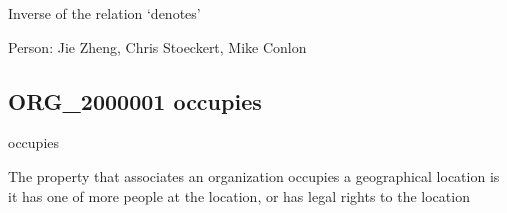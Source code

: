 \documentclass[letterpaper,10pt,english]{sphinxmanual}
\begin{document}
\begin{sphinxShadowBox}

\sphinxAtStartPar
{\hyperref[\detokenize{doc-IAO_0000136::doc}]{}}
\end{sphinxShadowBox}

\begin{sphinxShadowBox}

\sphinxAtStartPar
Inverse of the relation ‘denotes’
\end{sphinxShadowBox}

\begin{sphinxShadowBox}

\sphinxAtStartPar
{}
\end{sphinxShadowBox}

\begin{sphinxShadowBox}

\sphinxAtStartPar
Person: Jie Zheng, Chris Stoeckert, Mike Conlon
\end{sphinxShadowBox}
\begin{quote}

\ignorespaces \end{quote}


\subsection{ORG\_2000001 \sphinxhyphen{} occupies}
\label{\detokenize{doc-ORG_2000001:org-2000001-occupies}}\label{\detokenize{doc-ORG_2000001:index-0}}\label{\detokenize{doc-ORG_2000001::doc}}
\begin{sphinxShadowBox}

\sphinxAtStartPar
occupies
\end{sphinxShadowBox}

\begin{sphinxShadowBox}

\sphinxAtStartPar
{}
\end{sphinxShadowBox}

\begin{sphinxShadowBox}

\sphinxAtStartPar
The property that associates an organization occupies a geographical location is it has one of more people at the location, or has legal rights to the location
\end{sphinxShadowBox}
\end{document}
